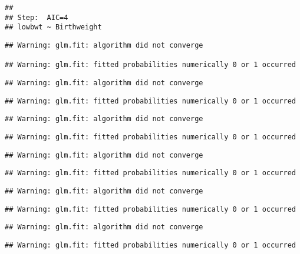 \documentclass[]{article}
\begin{document}
\begin{verbatim}
## 
## Step:  AIC=4
## lowbwt ~ Birthweight
\end{verbatim}

\begin{verbatim}
## Warning: glm.fit: algorithm did not converge

## Warning: glm.fit: fitted probabilities numerically 0 or 1 occurred
\end{verbatim}

\begin{verbatim}
## Warning: glm.fit: algorithm did not converge
\end{verbatim}

\begin{verbatim}
## Warning: glm.fit: fitted probabilities numerically 0 or 1 occurred
\end{verbatim}

\begin{verbatim}
## Warning: glm.fit: algorithm did not converge
\end{verbatim}

\begin{verbatim}
## Warning: glm.fit: fitted probabilities numerically 0 or 1 occurred
\end{verbatim}

\begin{verbatim}
## Warning: glm.fit: algorithm did not converge
\end{verbatim}

\begin{verbatim}
## Warning: glm.fit: fitted probabilities numerically 0 or 1 occurred
\end{verbatim}

\begin{verbatim}
## Warning: glm.fit: algorithm did not converge
\end{verbatim}

\begin{verbatim}
## Warning: glm.fit: fitted probabilities numerically 0 or 1 occurred
\end{verbatim}

\begin{verbatim}
## Warning: glm.fit: algorithm did not converge
\end{verbatim}

\begin{verbatim}
## Warning: glm.fit: fitted probabilities numerically 0 or 1 occurred
\end{verbatim}
\end{document}
